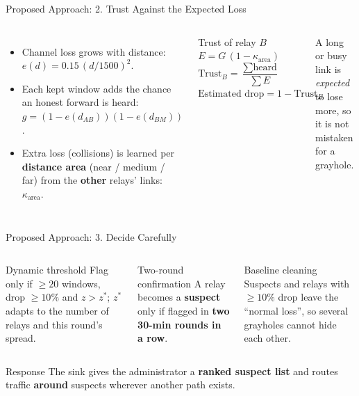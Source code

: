 \documentclass[aspectratio=169,11pt]{beamer}
\begin{document}
\begin{frame}{Proposed Approach: 2. Trust Against the Expected Loss}
  \begin{columns}[c]
      \begin{itemize}\setlength\itemsep{0.6em}
        \item Channel loss grows with distance: $e(d)=0.15\,(d/1500)^2$.
        \item Each kept window adds the chance an honest forward is heard: $g=(1-e(d_{AB}))(1-e(d_{BM}))$.
        \item Extra loss (collisions) is learned per \textbf{distance area} (near / medium / far) from the \textbf{other} relays' links: $\kappa_{\text{area}}$.
      \end{itemize}
      \begin{block}{Trust of relay $B$}
        \centering
        $E = G\,(1-\kappa_{\text{area}})$ \\[0.6em]
        $\text{Trust}_B = \dfrac{\sum \text{heard}}{\sum E}$\\[0.6em]
        $\text{Estimated drop} = 1-\text{Trust}_B$
      \end{block}
      \small A long or busy link is \emph{expected} to lose more, so it is not mistaken for a grayhole.
  \end{columns}
\end{frame}

\begin{frame}{Proposed Approach: 3. Decide Carefully}
  \begin{columns}[t]
      \begin{block}{Dynamic threshold}
        \small Flag only if $\geq 20$ windows, drop $\geq 10\%$ and $z > z^*$; $z^*$ adapts to the number of relays and this round's spread.
      \end{block}
      \begin{block}{Two-round confirmation}
        \small A relay becomes a \textbf{suspect} only if flagged in \textbf{two 30-min rounds in a row}.
      \end{block}
      \begin{block}{Baseline cleaning}
        \small Suspects and relays with $\geq 10\%$ drop leave the ``normal loss'', so several grayholes cannot hide each other.
      \end{block}
  \end{columns}

  \vspace{1em}
  \begin{alertblock}{Response}
    The sink gives the administrator a \textbf{ranked suspect list} and routes traffic \textbf{around} suspects wherever another path exists.
  \end{alertblock}
\end{frame}
\end{document}
